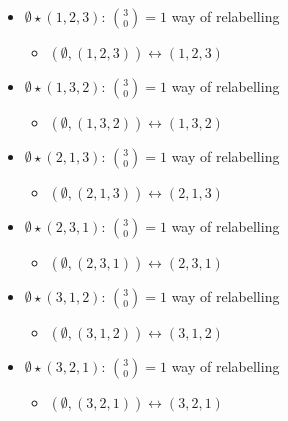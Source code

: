\begin{itemize}
    \item $\emptyset \star (1,2,3)$: $\binom{3}{0} = 1$ way of relabelling
        \begin{itemize}
            \item $(\emptyset, (1,2,3)) \leftrightarrow (1,2,3)$
        \end{itemize}
    \item $\emptyset \star (1,3,2)$: $\binom{3}{0} = 1$ way of relabelling
        \begin{itemize}
            \item $(\emptyset, (1,3,2)) \leftrightarrow (1,3,2)$
        \end{itemize}
    \item $\emptyset \star (2,1,3)$: $\binom{3}{0} = 1$ way of relabelling
        \begin{itemize}
            \item $(\emptyset, (2,1,3)) \leftrightarrow (2,1,3)$
        \end{itemize}
    \item $\emptyset \star (2,3,1)$: $\binom{3}{0} = 1$ way of relabelling
        \begin{itemize}
            \item $(\emptyset, (2,3,1)) \leftrightarrow (2,3,1)$
        \end{itemize}
    \item $\emptyset \star (3,1,2)$: $\binom{3}{0} = 1$ way of relabelling
        \begin{itemize}
            \item $(\emptyset, (3,1,2)) \leftrightarrow (3,1,2)$
        \end{itemize}
    \item $\emptyset \star (3,2,1)$: $\binom{3}{0} = 1$ way of relabelling
        \begin{itemize}
            \item $(\emptyset, (3,2,1)) \leftrightarrow (3,2,1)$
        \end{itemize}
\end{itemize}

